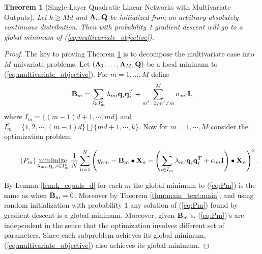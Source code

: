 \documentclass[11pt]{article}
\theoremstyle{plain}
\newtheorem{theorem}{Theorem}
\DeclareMathOperator*{\minimize}{minimize}
\theoremstyle{plain}
\numberwithin{equation}{section}
\numberwithin{lemma}{section}
\numberwithin{theorem}{section}
\numberwithin{corollary}{section}
\numberwithin{observation}{section}
\numberwithin{definition}{section}
\numberwithin{example}{section}
\begin{document}
\begin{theorem} [Single-Layer Quadratic Linear Networks with Multivariate Outputs] \label{thm:main_multivariate} Let $k \geq Md$ and $\Mx{\Lambda}_i, \Mx{Q}$ be initialized from an arbitrary absolutely continuous distribution. Then  with probability 1 gradient descent will 
go to a global minimum of (\ref{eq:multivariate_objective}).
\end{theorem}

\begin{proof} The key to proving Theorem \ref{thm:main_multivariate} is to decompose the multivariate case into $M$ univariate problems.
Let $(\Mx{\Lambda}_1, \ldots, \Mx{\Lambda}_M, \Mx{Q})$ be a local minimum to (\ref{eq:multivariate_objective}). For $m = 1, ..., M$ define
\[
\Mx{B}_{m} = \sum_{i \in I_m^c} \lambda_{mi} \V{q}_i \V{q}_i^T + \sum_{m'=1, m' \neq m}^M \alpha_{m'} \Mx{I} ,
\]
where $I_m = \{(m-1)d+1,\cdots, md\}$ and $I_m^c = \{1,2, \cdots, (m-1)d\} \bigcup \{ md+1, \cdots, k \}$. Now for $m=1, \cdots, M$ consider the optimization problem

\begin{equation} \label{eq:Pm}
\tag{$P_m$}    \minimize_{\lambda_{mi}, \V{q}_i, i \in I_m^c} \frac{1}{N} \sum_{n=1}^N \left( y_{nm} - \Mx{B}_m \bullet \Mx{X}_n - \left( \sum_{i \in I_m} \lambda_{mi} \V{q}_i \V{q}_i^T +\alpha_m \Mx{I}  \right) \bullet \Mx{X}_n  \right)^2.
\end{equation}

By Lemma \ref{lem:k_equals_d} for each $m$ the global minimum to (\ref{eq:Pm}) is the same as when $\Mx{B}_m = 0$. Moreover by Theorem \ref{thm:main_text:main}, and using random initialization with probability 1 any solution of (\ref{eq:Pm}) found by gradient descent is a global minimum. Moreover, given $\Mx{B}_m$'s, (\ref{eq:Pm})'s are independent in the sense that the optimization involves different set of parameters. Since each subproblem achieves its global minimum, (\ref{eq:multivariate_objective}) also achieves its global minimum.
\end{proof}
\end{document}
